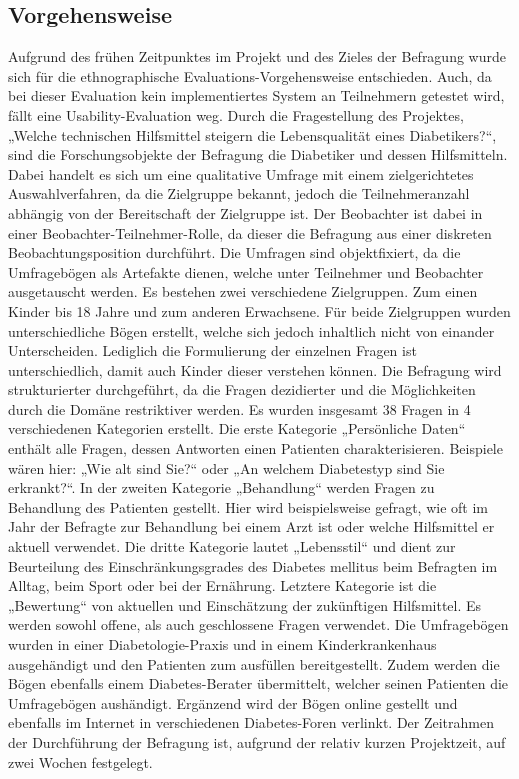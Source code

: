 \documentclass[a4paper,11pt]{article}%
\renewcommand{\\}{\vspace*{0.5\baselineskip} \newline}
\begin{document}
\subsection{Vorgehensweise}
	Aufgrund des frühen Zeitpunktes im Projekt und des Zieles der Befragung wurde sich für die ethnographische Evaluations-Vorgehensweise entschieden. Auch, da bei dieser Evaluation kein implementiertes System an Teilnehmern getestet wird, fällt eine Usability-Evaluation weg. Durch die Fragestellung des Projektes, „Welche technischen Hilfsmittel steigern die Lebensqualität eines Diabetikers?“, sind die Forschungsobjekte der Befragung die Diabetiker und dessen Hilfsmitteln. Dabei handelt es sich um eine qualitative Umfrage mit einem zielgerichtetes Auswahlverfahren, da die Zielgruppe bekannt, jedoch die Teilnehmeranzahl abhängig von der Bereitschaft der Zielgruppe ist. Der Beobachter ist dabei in einer Beobachter-Teilnehmer-Rolle, da dieser die Befragung aus einer diskreten Beobachtungsposition durchführt. Die Umfragen sind objektfixiert, da die Umfragebögen als Artefakte dienen, welche unter Teilnehmer und Beobachter ausgetauscht werden.\newline
	Es bestehen zwei verschiedene Zielgruppen. Zum einen Kinder bis 18 Jahre und zum anderen Erwachsene. Für beide Zielgruppen wurden unterschiedliche Bögen erstellt, welche sich jedoch inhaltlich nicht von einander Unterscheiden. Lediglich die Formulierung der einzelnen Fragen ist unterschiedlich, damit auch Kinder dieser verstehen können.\newline
	Die Befragung wird strukturierter durchgeführt, da die Fragen dezidierter und die Möglichkeiten durch die Domäne restriktiver werden. Es wurden insgesamt 38 Fragen in 4 verschiedenen Kategorien erstellt. Die erste Kategorie „Persönliche Daten“ enthält alle Fragen, dessen Antworten einen Patienten charakterisieren.\newline
	Beispiele wären hier: „Wie alt sind Sie?“ oder „An welchem Diabetestyp sind Sie erkrankt?“. In der zweiten Kategorie „Behandlung“ werden Fragen zu Behandlung des Patienten gestellt. Hier wird beispielsweise gefragt, wie oft im Jahr der Befragte zur Behandlung bei einem Arzt ist oder welche Hilfsmittel er aktuell verwendet. Die dritte Kategorie lautet „Lebensstil“ und dient zur Beurteilung des Einschränkungsgrades des Diabetes mellitus beim Befragten im Alltag, beim Sport oder bei der Ernährung. Letztere Kategorie ist die „Bewertung“ von aktuellen und Einschätzung der zukünftigen Hilfsmittel.\newline
	Es werden sowohl offene, als auch geschlossene Fragen verwendet. Die Umfragebögen wurden in einer Diabetologie-Praxis und in einem Kinderkrankenhaus ausgehändigt und den Patienten zum ausfüllen bereitgestellt. Zudem werden die Bögen
	ebenfalls einem Diabetes-Berater übermittelt, welcher seinen Patienten die Umfragebögen aushändigt. Ergänzend wird der Bögen online gestellt und ebenfalls im Internet in verschiedenen Diabetes-Foren verlinkt. Der Zeitrahmen der Durchführung der Befragung ist, aufgrund der relativ kurzen Projektzeit, auf zwei Wochen festgelegt.
\end{document}
